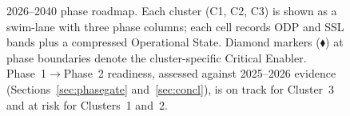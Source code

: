 \documentclass[10pt]{article}
\begin{document}
\begin{figure}[p]
\caption{2026--2040 phase roadmap. Each cluster (C1, C2, C3) is shown as a swim-lane with three phase columns; each cell records ODP and SSL bands plus a compressed Operational State. Diamond markers ($\blacklozenge$) at phase boundaries denote the cluster-specific Critical Enabler. Phase~1$\rightarrow$Phase~2 readiness, assessed against 2025--2026 evidence (Sections~\ref{sec:phasegate} and~\ref{sec:concl}), is on track for Cluster~3 and at risk for Clusters~1 and~2.}
\label{fig:phase-roadmap}
\end{figure}
\end{document}
